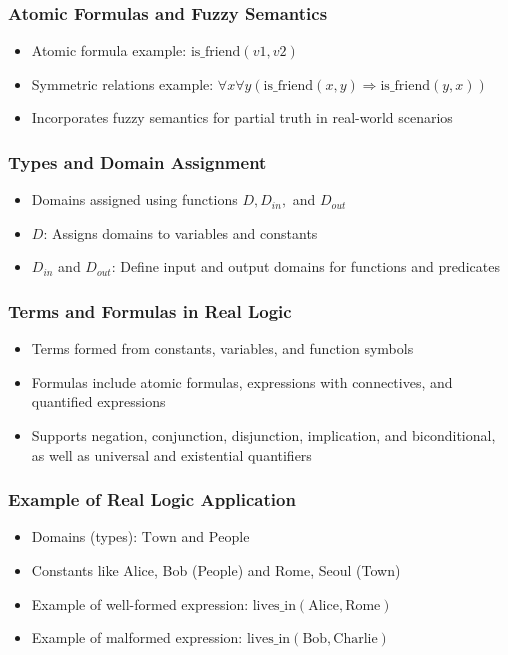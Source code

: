 \documentclass{beamer}
\begin{document}
\begin{frame}
\frametitle{Atomic Formulas and Fuzzy Semantics}
\begin{itemize}
    \item Atomic formula example: \( \text{is\_friend}(v1, v2) \)
    \item Symmetric relations example: \( \forall x \forall y
      (\text{is\_friend}(x, y) \Rightarrow \text{is\_friend}(y, x))
      \)
    \item Incorporates fuzzy semantics for partial truth in real-world
      scenarios
\end{itemize}
\end{frame}

\begin{frame}
\frametitle{Types and Domain Assignment}
\begin{itemize}
    \item Domains assigned using functions \( D, D_{in}, \) and \( D_{out} \)
    \item \( D \): Assigns domains to variables and constants
    \item \( D_{in} \) and \( D_{out} \): Define input and output domains
      for functions and predicates
\end{itemize}
\end{frame}

\begin{frame}
\frametitle{Terms and Formulas in Real Logic}
\begin{itemize}
    \item Terms formed from constants, variables, and function symbols
    \item Formulas include atomic formulas, expressions with
      connectives, and quantified expressions
    \item Supports negation, conjunction, disjunction, implication,
      and biconditional, as well as universal and existential
      quantifiers
\end{itemize}
\end{frame}

\begin{frame}
\frametitle{Example of Real Logic Application}
\begin{itemize}
    \item Domains (types): \( \text{Town} \) and \( \text{People} \)
    \item Constants like Alice, Bob (People) and Rome, Seoul (Town)
    \item Example of well-formed expression: \(
      \text{lives\_in}(\text{Alice}, \text{Rome}) \) 
    \item Example of malformed expression: \(
      \text{lives\_in}(\text{Bob}, \text{Charlie}) \)
\end{itemize}
\end{frame}
\end{document}
